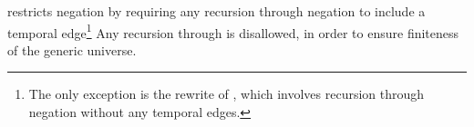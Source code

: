 \vspace{1em}
\lang restricts negation by requiring any recursion through negation to include a temporal edge\footnote{The only exception is the rewrite of , which involves recursion through negation without any temporal edges.}  Any recursion through  is disallowed, in order to ensure finiteness of the generic universe.




%

